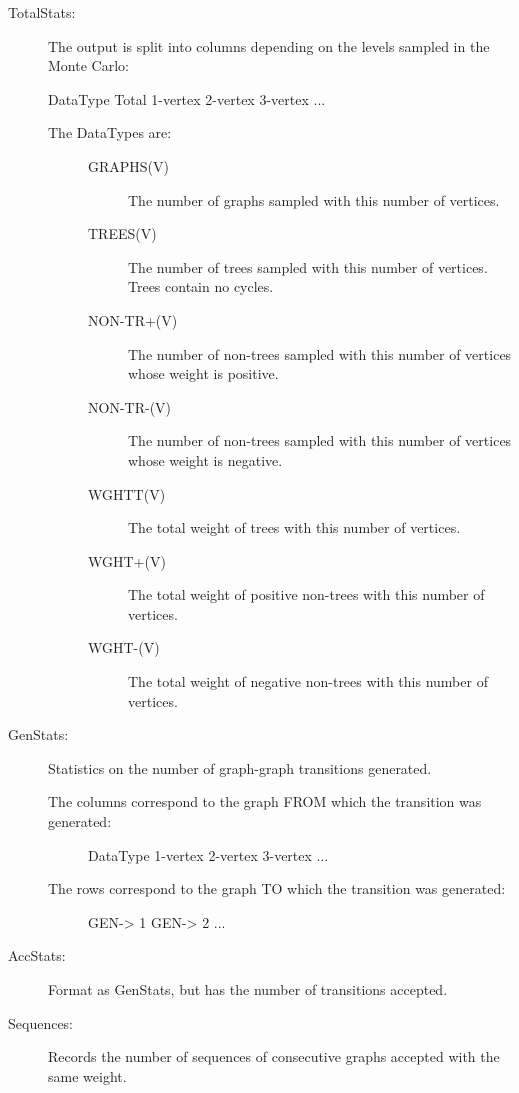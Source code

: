 \documentclass[openany,a4paper,10pt]{manual}
\begin{document}
\begin{description}
\item[TotalStats:]
The output is split into columns depending on the levels sampled in the Monte Carlo:

DataType    Total    1-vertex    2-vertex    3-vertex    ...
\begin{description}
\item[The DataTypes are:]\begin{description}
\item[GRAPHS(V)]
The number of graphs sampled with this number of vertices.

\item[TREES(V)]
The number of trees sampled with this number of vertices.  Trees contain no cycles.

\item[NON-TR+(V)]
The number of non-trees sampled with this number of vertices whose weight is positive.

\item[NON-TR-(V)]
The number of non-trees sampled with this number of vertices whose weight is negative.

\item[WGHTT(V)]
The total weight of trees with this number of vertices.

\item[WGHT+(V)]
The total weight of positive non-trees with this number of vertices.

\item[WGHT-(V)]
The total weight of negative non-trees with this number of vertices.

\end{description}

\end{description}

\item[GenStats:]
Statistics on the number of graph-graph transitions generated.
\begin{description}
\item[The columns correspond to the graph FROM which the transition was generated:]
DataType    1-vertex    2-vertex    3-vertex    ...

\item[The rows correspond to the graph TO which the transition was generated:]
GEN-\textgreater{} 1
GEN-\textgreater{} 2
...

\end{description}

\item[AccStats:]
Format as GenStats, but has the number of transitions accepted.

\item[Sequences:]
Records the number of sequences of consecutive graphs accepted with the same weight.

\end{description}
\end{document}
